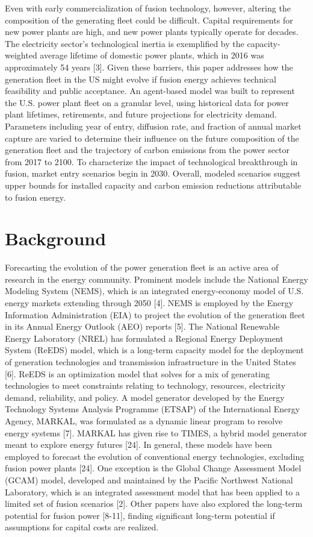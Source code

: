 \documentclass[preprint, 12pt]{elsarticle}
\begin{document}
Even with early commercialization of fusion technology, however, altering the composition of the generating fleet could be difficult. Capital requirements for new power plants are high, and new power plants typically operate for decades. The electricity sector's technological inertia is exemplified by the capacity-weighted average lifetime of domestic power plants, which in 2016 was approximately 54 years [3]. Given these barriers, this paper addresses how the generation fleet in the US might evolve if fusion energy achieves technical feasibility and public acceptance. An agent-based model was built to represent the U.S. power plant fleet on a granular level, using historical data for power plant lifetimes, retirements, and future projections for electricity demand. Parameters including year of entry, diffusion rate, and fraction of annual market capture are varied to determine their influence on the future composition of the generation fleet and the trajectory of carbon emissions from the power sector from 2017 to 2100. To characterize the impact of technological breakthrough in fusion, market entry scenarios begin in 2030. Overall, modeled scenarios suggest upper bounds for installed capacity and carbon emission reductions attributable to fusion energy. 

\section{Background}

Forecasting the evolution of the power generation fleet is an active area of research in the energy community. Prominent models include the National Energy Modeling System (NEMS), which is an integrated energy-economy model of U.S. energy markets extending through 2050 [4]. NEMS is employed by the Energy Information Administration (EIA) to project the evolution of the generation fleet in its Annual Energy Outlook (AEO) reports [5]. The National Renewable Energy Laboratory (NREL) has formulated a Regional Energy Deployment System (ReEDS) model, which is a long-term capacity model for the deployment of generation technologies and transmission infrastructure in the United States [6]. ReEDS is an optimization model that solves for a mix of generating technologies to meet constraints relating to technology, resources, electricity demand, reliability, and policy. A model generator developed by the Energy Technology Systems Analysis Programme (ETSAP) of the International Energy Agency, MARKAL, was formulated as a dynamic linear program to resolve energy systems [7]. MARKAL has given rise to TIMES, a hybrid model generator meant to explore energy futures [24]. In general, these models have been employed to forecast the evolution of conventional energy technologies, excluding fusion power plants [24]. One exception is the Global Change Assessment Model (GCAM) model, developed and maintained by the Pacific Northwest National Laboratory, which is an integrated assessment model that has been applied to a limited set of fusion scenarios [2]. Other papers have also explored the long-term potential for fusion power [8-11], finding significant long-term potential if assumptions for capital costs are realized. 
\end{document}
